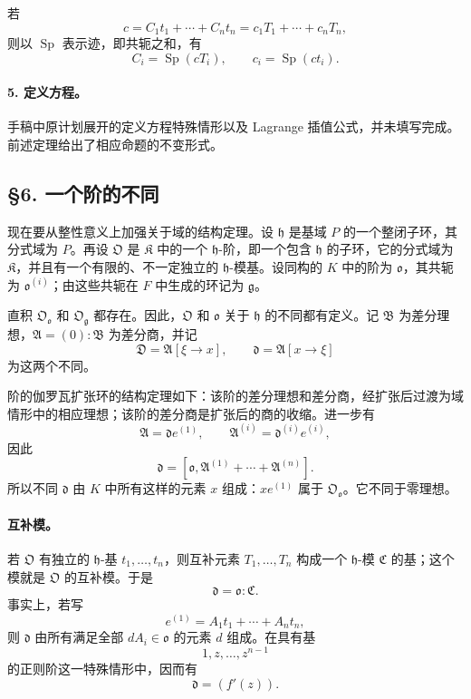 若
\[
        c=C_1t_1+
        \cdots+C_nt_n
        =c_1T_1+
        \cdots+c_nT_n,
\]
则以 \(\operatorname{Sp}\) 表示迹，即共轭之和，有
\[
        C_i=\operatorname{Sp}(cT_i),
        \qquad
        c_i=\operatorname{Sp}(ct_i).
\]

\paragraph{5. 定义方程。}
手稿中原计划展开的定义方程特殊情形以及 Lagrange 插值公式，并未填写完成。前述定理给出了相应命题的不变形式。

\subsection*{§6. 一个阶的不同}

现在要从整性意义上加强关于域的结构定理。设 \(\mathfrak h\) 是基域 \(P\) 的一个整闭子环，其分式域为 \(P\)。再设 \(\mathfrak O\) 是 \(\mathfrak K\) 中的一个 \(\mathfrak h\)-阶，即一个包含 \(\mathfrak h\) 的子环，它的分式域为 \(\mathfrak K\)，并且有一个有限的、不一定独立的 \(\mathfrak h\)-模基。设同构的 \(K\) 中的阶为 \(\mathfrak o\)，其共轭为 \(\mathfrak o^{(i)}\)；由这些共轭在 \(F\) 中生成的环记为 \(\mathfrak g\)。

直积 \(\mathfrak O_{\mathfrak o}\) 和 \(\mathfrak O_{\mathfrak g}\) 都存在。因此，\(\mathfrak O\) 和 \(\mathfrak o\) 关于 \(\mathfrak h\) 的不同都有定义。记 \(\mathfrak B\) 为差分理想，\(\mathfrak A=(0):\mathfrak B\) 为差分商，并记
\[
        \mathfrak D=\mathfrak A[\xi\to x],
        \qquad
        \mathfrak d=\mathfrak A[x\to\xi]
\]
为这两个不同。

阶的伽罗瓦扩张环的结构定理如下：该阶的差分理想和差分商，经扩张后过渡为域情形中的相应理想；该阶的差分商是扩张后的商的收缩。进一步有
\[
        \mathfrak A=\mathfrak d e^{(1)},
        \qquad
        \mathfrak A^{(i)}=\mathfrak d^{(i)}e^{(i)},
\]
因此
\[
        \mathfrak d=[\mathfrak o,\mathfrak A^{(1)}+
        \cdots+\mathfrak A^{(n)}].
\]
所以不同 \(\mathfrak d\) 由 \(K\) 中所有这样的元素 \(x\) 组成：\(xe^{(1)}\) 属于 \(\mathfrak O_{\mathfrak o}\)。它不同于零理想。

\paragraph{互补模。}
若 \(\mathfrak O\) 有独立的 \(\mathfrak h\)-基 \(t_1,\ldots,t_n\)，则互补元素 \(T_1,\ldots,T_n\) 构成一个 \(\mathfrak h\)-模 \(\mathfrak C\) 的基；这个模就是 \(\mathfrak O\) 的互补模。于是
\[
        \mathfrak d=\mathfrak o:\mathfrak C.
\]
事实上，若写
\[
        e^{(1)}=A_1t_1+
        \cdots+A_nt_n,
\]
则 \(\mathfrak d\) 由所有满足全部 \(dA_i\in\mathfrak o\) 的元素 \(d\) 组成。在具有基
\[
        1,z,\ldots,z^{n-1}
\]
的正则阶这一特殊情形中，因而有
\[
        \mathfrak d=(f'(z)).
\]

